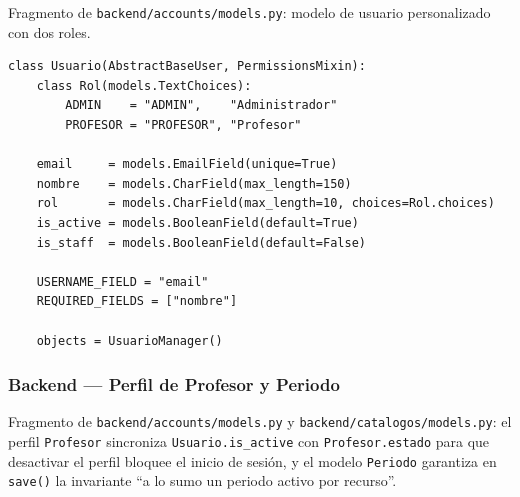 Fragmento de \texttt{backend/accounts/models.py}: modelo de usuario personalizado con dos roles.

\begin{lstlisting}[language={[3]Python}]
class Usuario(AbstractBaseUser, PermissionsMixin):
    class Rol(models.TextChoices):
        ADMIN    = "ADMIN",    "Administrador"
        PROFESOR = "PROFESOR", "Profesor"

    email     = models.EmailField(unique=True)
    nombre    = models.CharField(max_length=150)
    rol       = models.CharField(max_length=10, choices=Rol.choices)
    is_active = models.BooleanField(default=True)
    is_staff  = models.BooleanField(default=False)

    USERNAME_FIELD = "email"
    REQUIRED_FIELDS = ["nombre"]

    objects = UsuarioManager()
\end{lstlisting}

\subsubsection{Backend --- Perfil de Profesor y Periodo}\label{lst:modelos_perfil_periodo}

Fragmento de \texttt{backend/accounts/models.py} y \texttt{backend/catalogos/models.py}: el perfil \texttt{Profesor} sincroniza \texttt{Usuario.is\_active} con \texttt{Profesor.estado} para que desactivar el perfil bloquee el inicio de sesión, y el modelo \texttt{Periodo} garantiza en \texttt{save()} la invariante ``a lo sumo un periodo activo por recurso''.

